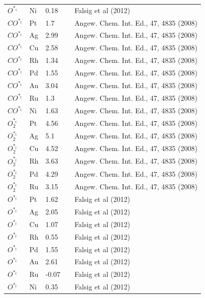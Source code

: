 \documentclass[a4paper,8pt]{report}
\begin{document}
\begin{longtable}{lllll}
$O^{*_s}$& Ni& 0.18& & \parbox[t]{4cm}{Falsig et al (2012)}\\
$CO^{*_t}$& Pt& 1.7& & \parbox[t]{4cm}{Angew. Chem. Int. Ed., 47, 4835 (2008)}\\
$CO^{*_t}$& Ag& 2.99& & \parbox[t]{4cm}{Angew. Chem. Int. Ed., 47, 4835 (2008)}\\
$CO^{*_t}$& Cu& 2.58& & \parbox[t]{4cm}{Angew. Chem. Int. Ed., 47, 4835 (2008)}\\
$CO^{*_t}$& Rh& 1.34& & \parbox[t]{4cm}{Angew. Chem. Int. Ed., 47, 4835 (2008)}\\
$CO^{*_t}$& Pd& 1.55& & \parbox[t]{4cm}{Angew. Chem. Int. Ed., 47, 4835 (2008)}\\
$CO^{*_t}$& Au& 3.04& & \parbox[t]{4cm}{Angew. Chem. Int. Ed., 47, 4835 (2008)}\\
$CO^{*_t}$& Ru& 1.3& & \parbox[t]{4cm}{Angew. Chem. Int. Ed., 47, 4835 (2008)}\\
$CO^{*_t}$& Ni& 1.63& & \parbox[t]{4cm}{Angew. Chem. Int. Ed., 47, 4835 (2008)}\\
$O_{2}^{*_t}$& Pt& 4.56& & \parbox[t]{4cm}{Angew. Chem. Int. Ed., 47, 4835 (2008)}\\
$O_{2}^{*_t}$& Ag& 5.1& & \parbox[t]{4cm}{Angew. Chem. Int. Ed., 47, 4835 (2008)}\\
$O_{2}^{*_t}$& Cu& 4.52& & \parbox[t]{4cm}{Angew. Chem. Int. Ed., 47, 4835 (2008)}\\
$O_{2}^{*_t}$& Rh& 3.63& & \parbox[t]{4cm}{Angew. Chem. Int. Ed., 47, 4835 (2008)}\\
$O_{2}^{*_t}$& Pd& 4.29& & \parbox[t]{4cm}{Angew. Chem. Int. Ed., 47, 4835 (2008)}\\
$O_{2}^{*_t}$& Ru& 3.15& & \parbox[t]{4cm}{Angew. Chem. Int. Ed., 47, 4835 (2008)}\\
$O^{*_t}$& Pt& 1.62& & \parbox[t]{4cm}{Falsig et al (2012)}\\
$O^{*_t}$& Ag& 2.05& & \parbox[t]{4cm}{Falsig et al (2012)}\\
$O^{*_t}$& Cu& 1.07& & \parbox[t]{4cm}{Falsig et al (2012)}\\
$O^{*_t}$& Rh& 0.55& & \parbox[t]{4cm}{Falsig et al (2012)}\\
$O^{*_t}$& Pd& 1.55& & \parbox[t]{4cm}{Falsig et al (2012)}\\
$O^{*_t}$& Au& 2.61& & \parbox[t]{4cm}{Falsig et al (2012)}\\
$O^{*_t}$& Ru& -0.07& & \parbox[t]{4cm}{Falsig et al (2012)}\\
$O^{*_t}$& Ni& 0.35& & \parbox[t]{4cm}{Falsig et al (2012)}\\

\end{longtable}
\end{document}
